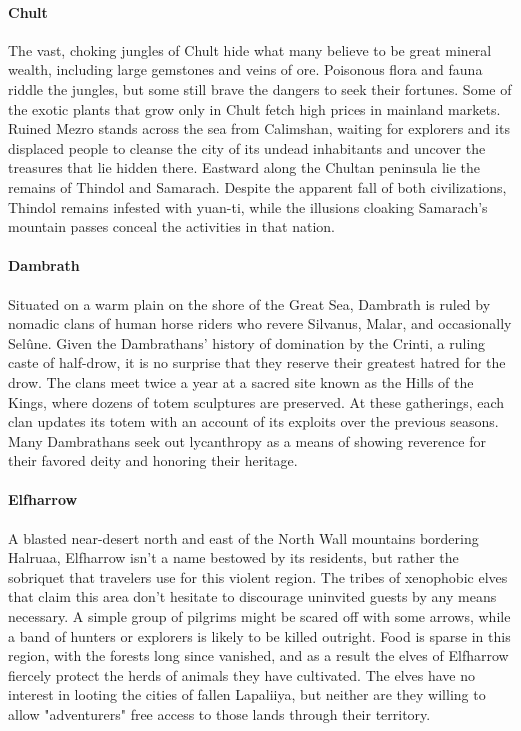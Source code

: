 \documentclass[10pt,a4paper,twoside,twocolumn,openany,bg=print,nodeprecatedcode]{dndbook}
\begin{document}
\paragraph{Chult}
The vast, choking jungles of Chult hide what many believe to be great mineral wealth, including large gemstones and veins of ore. Poisonous flora and fauna riddle the jungles, but some still brave the dangers to seek their fortunes. Some of the exotic plants that grow only in Chult fetch high prices in mainland markets. Ruined Mezro stands across the sea from Calimshan, waiting for explorers and its displaced people to cleanse the city of its undead inhabitants and uncover the treasures that lie hidden there.
Eastward along the Chultan peninsula lie the remains of Thindol and Samarach. Despite the apparent fall of both civilizations, Thindol remains infested with yuan-ti, while the illusions cloaking Samarach's mountain passes conceal the activities in that nation.
\paragraph{Dambrath}
Situated on a warm plain on the shore of the Great Sea, Dambrath is ruled by nomadic clans of human horse riders who revere Silvanus, Malar, and occasionally Selûne. Given the Dambrathans' history of domination by the Crinti, a ruling caste of half-drow, it is no surprise that they reserve their greatest hatred for the drow.
The clans meet twice a year at a sacred site known as the Hills of the Kings, where dozens of totem sculptures are preserved. At these gatherings, each clan updates its totem with an account of its exploits over the previous seasons. Many Dambrathans seek out lycanthropy as a means of showing reverence for their favored deity and honoring their heritage.
\paragraph{Elfharrow}
A blasted near-desert north and east of the North Wall mountains bordering Halruaa, Elfharrow isn't a name bestowed by its residents, but rather the sobriquet that travelers use for this violent region. The tribes of xenophobic elves that claim this area don't hesitate to discourage uninvited guests by any means necessary. A simple group of pilgrims might be scared off with some arrows, while a band of hunters or explorers is likely to be killed outright.
Food is sparse in this region, with the forests long since vanished, and as a result the elves of Elfharrow fiercely protect the herds of animals they have cultivated. The elves have no interest in looting the cities of fallen Lapaliiya, but neither are they willing to allow "adventurers" free access to those lands through their territory.
\end{document}
